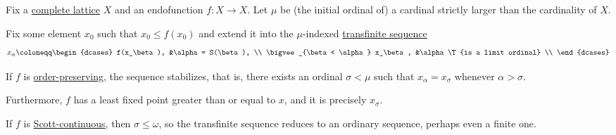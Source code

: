 \begin{theorem}\label{thm:knaster_tarski_iteration}
  Fix a \hyperref[def:complete_lattice]{complete lattice} \( X \) and an endofunction \( f: X \to X \). Let \( \mu \) be (the initial ordinal of) a cardinal strictly larger than the cardinality of \( X \).

  Fix some element \( x_0 \) such that \( x_0 \leq f(x_0) \) and extend it into the \( \mu \)-indexed \hyperref[def:transfinite_sequence]{transfinite sequence}
  \begin{equation*}
    x_\alpha \coloneqq \begin{dcases}
      f(x_\beta),                       &\alpha = S(\beta), \\
      \bigvee_{\beta < \alpha} x_\beta, &\alpha \T{is a limit ordinal} \\
    \end{dcases}
  \end{equation*}

  \begin{thmenum}
     If \( f \) is \hyperref[def:order_function]{order-preserving}, the sequence stabilizes, that is, there exists an ordinal \( \sigma < \mu \) such that \( x_\alpha = x_\sigma \) whenever \( \alpha > \sigma \).

     Furthermore, \( f \) has a least fixed point greater than or equal to \( x \), and it is precisely \( x_\sigma \).

     If \( f \) is \hyperref[def:scott_continuity]{Scott-continuous}, then \( \sigma \leq \omega \), so the transfinite sequence reduces to an ordinary sequence, perhaps even a finite one.
  \end{thmenum}
\end{theorem}
